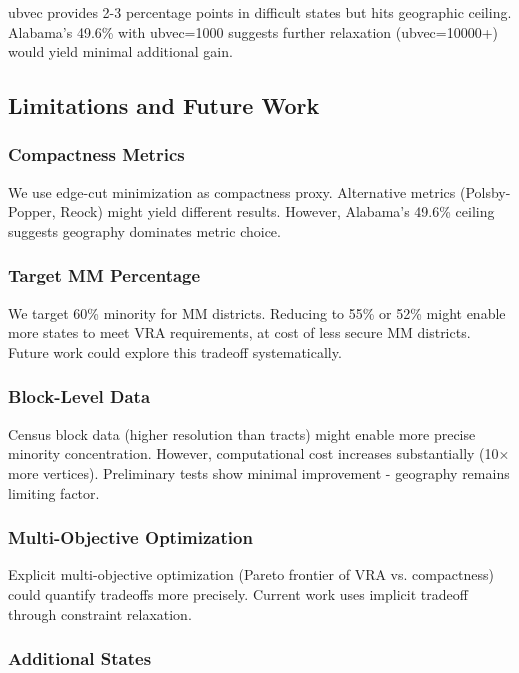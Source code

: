 ubvec provides 2-3 percentage points in difficult states but hits geographic ceiling. Alabama's 49.6\% with ubvec=1000 suggests further relaxation (ubvec=10000+) would yield minimal additional gain.

\subsection{Limitations and Future Work}

\subsubsection{Compactness Metrics}

We use edge-cut minimization as compactness proxy. Alternative metrics (Polsby-Popper, Reock) might yield different results. However, Alabama's 49.6\% ceiling suggests geography dominates metric choice.

\subsubsection{Target MM Percentage}

We target 60\% minority for MM districts. Reducing to 55\% or 52\% might enable more states to meet VRA requirements, at cost of less secure MM districts. Future work could explore this tradeoff systematically.

\subsubsection{Block-Level Data}

Census block data (higher resolution than tracts) might enable more precise minority concentration. However, computational cost increases substantially (10$\times$ more vertices). Preliminary tests show minimal improvement - geography remains limiting factor.

\subsubsection{Multi-Objective Optimization}

Explicit multi-objective optimization (Pareto frontier of VRA vs. compactness) could quantify tradeoffs more precisely. Current work uses implicit tradeoff through constraint relaxation.

\subsubsection{Additional States}

